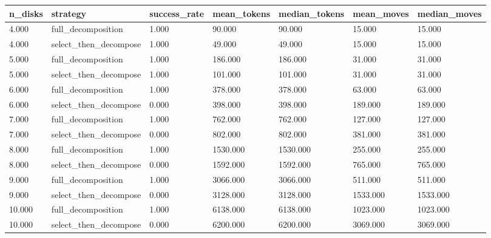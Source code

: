 \begin{tabular}{lllllll}
\toprule
n\_disks & strategy & success\_rate & mean\_tokens & median\_tokens & mean\_moves & median\_moves \\
\midrule
4.000 & full\_decomposition & 1.000 & 90.000 & 90.000 & 15.000 & 15.000 \\
4.000 & select\_then\_decompose & 1.000 & 49.000 & 49.000 & 15.000 & 15.000 \\
5.000 & full\_decomposition & 1.000 & 186.000 & 186.000 & 31.000 & 31.000 \\
5.000 & select\_then\_decompose & 1.000 & 101.000 & 101.000 & 31.000 & 31.000 \\
6.000 & full\_decomposition & 1.000 & 378.000 & 378.000 & 63.000 & 63.000 \\
6.000 & select\_then\_decompose & 0.000 & 398.000 & 398.000 & 189.000 & 189.000 \\
7.000 & full\_decomposition & 1.000 & 762.000 & 762.000 & 127.000 & 127.000 \\
7.000 & select\_then\_decompose & 0.000 & 802.000 & 802.000 & 381.000 & 381.000 \\
8.000 & full\_decomposition & 1.000 & 1530.000 & 1530.000 & 255.000 & 255.000 \\
8.000 & select\_then\_decompose & 0.000 & 1592.000 & 1592.000 & 765.000 & 765.000 \\
9.000 & full\_decomposition & 1.000 & 3066.000 & 3066.000 & 511.000 & 511.000 \\
9.000 & select\_then\_decompose & 0.000 & 3128.000 & 3128.000 & 1533.000 & 1533.000 \\
10.000 & full\_decomposition & 1.000 & 6138.000 & 6138.000 & 1023.000 & 1023.000 \\
10.000 & select\_then\_decompose & 0.000 & 6200.000 & 6200.000 & 3069.000 & 3069.000 \\
\bottomrule
\end{tabular}
